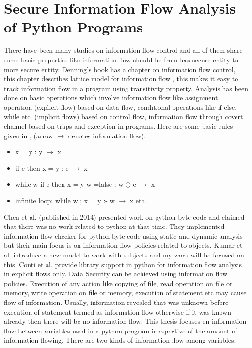 \chapter{Secure Information Flow Analysis of Python Programs}
There have been many studies on information flow control and all of them share some basic properties like information flow should be from less secure entity to more secure entity. Denning's book \cite{denning} has a chapter on information flow control, this chapter describes lattice model for information flow \cite{lattice}, this makes it easy to track information flow in a program using transitivity property. Analysis has been done on basic operations which involve information flow like assignment operation (explicit flow) based on data flow, conditional operations like if else, while etc. (implicit flows) based on control flow, information flow through covert channel based on traps and exception in programs. Here are some basic rules given in \cite{denning}, (arrow $\rightarrow$ denotes information flow).  
\begin{itemize}
	\item x = y : y $\rightarrow$ x
	\item if e then x = y : e $\rightarrow$ x
	\item while w {if e then{ x = y} w =false } : w $\oplus$ e $\rightarrow$ x
	\item infinite loop: while w {}; x = y :- w $\rightarrow$ x etc.   
\end{itemize}
Chen et al. \cite{hybrid}(published in 2014) presented work on python byte-code and claimed that there was no work related to python at that time. They implemented information flow checker for python byte-code using static and dynamic analysis but their main focus is on information flow policies related to objects. Kumar et al. \cite{rwfm} introduce a new model to work with subjects and my work will be focused on this. Conti et al. \cite{taint} provide library support in python for information flow analysis in explicit flows only.
Data Security can be achieved using information flow policies. Execution of any action
like copying of file, read operation on file or memory, write operation on file or memory, execution of statement etc may cause flow of information. Usually, information revealed that was
unknown before execution of statement termed as information flow otherwise if it was known already then there will be no information flow. This thesis focuses on information flow between
variables used in a python program irrespective of the amount of information flowing. There are two kinds of information flow among variables:\\
